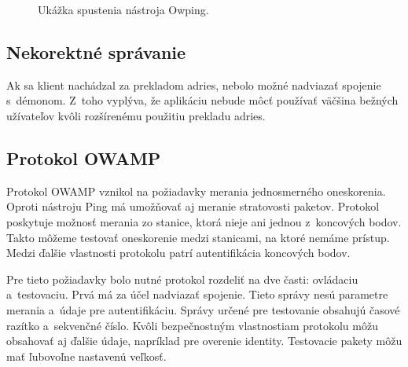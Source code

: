        \begin{figure}[H]
           \begin{center}
                   \caption{Ukážka spustenia nástroja Owping.}
               \label{owping_c_110}
           \end{center}
       \end{figure}

        \subsection{Nekorektné správanie} \label{owamp_chyby}
        Ak sa klient nachádzal za prekladom adries, nebolo možné 
        nadviazať spojenie s~démonom. Z~toho vyplýva, že aplikáciu nebude
        môcť používať väčšina bežných užívateľov kvôli rozšírenému použitiu  
        prekladu adries.

        \subsection{Protokol OWAMP}
        Protokol OWAMP vznikol na požiadavky merania jednosmerného
        oneskorenia. Oproti nástroju Ping má umožňovať aj meranie stratovosti 
        paketov.  
        Protokol poskytuje možnosť merania zo stanice, ktorá nieje 
        ani jednou z~koncových bodov. Takto môžeme testovať 
        oneskorenie medzi stanicami, na ktoré nemáme prístup.
        Medzi ďalšie vlastnosti protokolu patrí autentifikácia 
        koncových bodov.
        
        Pre tieto požiadavky bolo nutné protokol rozdeliť na dve časti:
        ovládaciu a~testovaciu. Prvá má za účel nadviazať spojenie.
        Tieto správy nesú parametre merania a~údaje pre
        autentifikáciu. Správy určené pre testovanie obsahujú časové 
        razítko a~sekvenčné číslo. Kvôli bezpečnostným vlastnostiam protokolu
        môžu obsahovať aj ďalšie údaje, napríklad pre overenie identity.
        Testovacie pakety môžu mať ľubovoľne nastavenú veľkosť.

